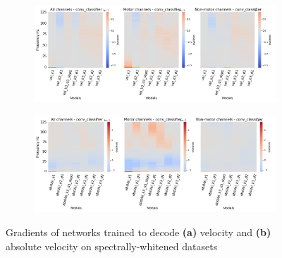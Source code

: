 \begin{figure}[!htbp]
\begin{subfigure}[a]{\textwidth}
   \includegraphics[width=1\linewidth]{img/ch4/vel-pw-last-layer-grads}
   \caption{}
   \label{fig:vel-pw-last-layer-grads}
\end{subfigure}

\begin{subfigure}[b]{\textwidth}
   \includegraphics[width=1\linewidth]{img/ch4/absVel-pw-last-layer-grads}
   \caption{}
\end{subfigure}\label{fig:absVel-pw-last-layet-grads}
\caption[Spectral whitening - gradients]{Gradients of networks trained to decode \textbf{(a)} velocity and \textbf{(b)} absolute velocity on spectrally-whitened datasets}
\label{fig:pw-last-layer-grads}
\end{figure}
